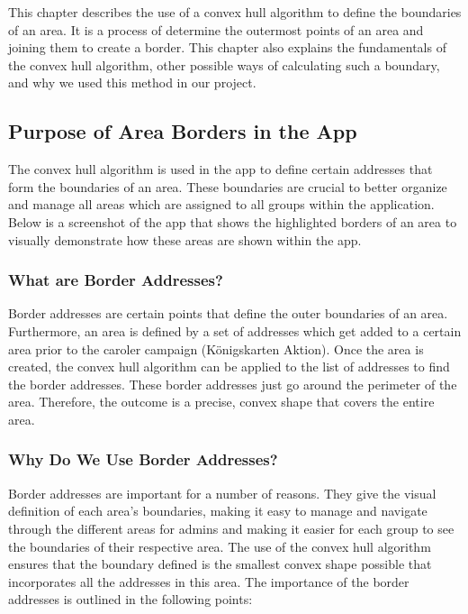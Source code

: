 \Author{\daAuthorThree}

    This chapter describes the use of a convex hull algorithm to define the boundaries of an area. It is a process of determine the outermost points of an area and joining them to create a border. This chapter also explains the fundamentals of the convex hull algorithm, other possible ways of calculating such a boundary, and why we used this method in our project.

    \subsection{Purpose of Area Borders in the App}
    The convex hull algorithm is used in the app to define certain addresses that form the boundaries of an area. These boundaries are crucial to better organize and manage all areas which are assigned to all groups within the application. Below is a screenshot of the app that shows the highlighted borders of an area to visually demonstrate how these areas are shown within the app.

    \subsubsection{What are Border Addresses?}
    Border addresses are certain points that define the outer boundaries of an area. Furthermore, an area is defined by a set of addresses which get added to a certain area prior to the caroler campaign (Königskarten Aktion). Once the area is created, the convex hull algorithm can be applied to the list of addresses to find the border addresses. These border addresses just go around the perimeter of the area. Therefore, the outcome is a precise, convex shape that covers the entire area.
    
    \subsubsection{Why Do We Use Border Addresses?}
    Border addresses are important for a number of reasons. They give the visual definition of each area's boundaries, making it easy to manage and navigate through the different areas for admins and making it easier for each group to see the boundaries of their respective area. The use of the convex hull algorithm ensures that the boundary defined is the smallest convex shape possible that incorporates all the addresses in this area. The importance of the border addresses is outlined in the following points:


